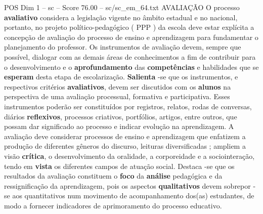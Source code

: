 \begin{textsample}{POS Dim 1 – sc – Score 76.00 – sc/sc\_em\_64.txt}
AVALIAÇÃO O processo \textbf{avaliativo} considera a legislação vigente no âmbito estadual e no nacional, portanto, no projeto político-pedagógico ( PPP ) da escola deve estar explícita a concepção de avaliação do processo de ensino e aprendizagem para fundamentar o planejamento do professor.
Os instrumentos de avaliação devem, sempre que possível, dialogar com as demais áreas de conhecimentos a fim de contribuir para o desenvolvimento e o \textbf{aprofundamento} das \textbf{competências} e habilidades que se \textbf{esperam} desta etapa de escolarização. \textbf{Salienta} -se que os instrumentos, e respectivos critérios \textbf{avaliativos}, devem ser discutidos com os \textbf{alunos} na perspectiva de uma avaliação processual, formativa e participativa.
Esses instrumentos poderão ser constituídos por registros, relatos, rodas de conversas, diários \textbf{reflexivos}, processos criativos, portfólios, artigos, entre outros, que possam dar significado ao processo e indicar evolução na aprendizagem.
A avaliação deve considerar processos de ensino e aprendizagem que enfatizem a produção de diferentes gêneros do discurso, leituras diversificadas ; ampliem a visão \textbf{crítica}, o desenvolvimento da oralidade, a corporeidade e a sociointeração, tendo em \textbf{vista} os diferentes campos de atuação social.
Destaca -se que os resultados da avaliação constituem o \textbf{foco} da \textbf{análise} pedagógica e da ressignificação da aprendizagem, pois os aspectos \textbf{qualitativos} devem sobrepor -se aos quantitativos num movimento de acompanhamento dos(as) estudantes, de modo a fornecer indicadores de aprimoramento do processo educativo.

\end{textsample}
